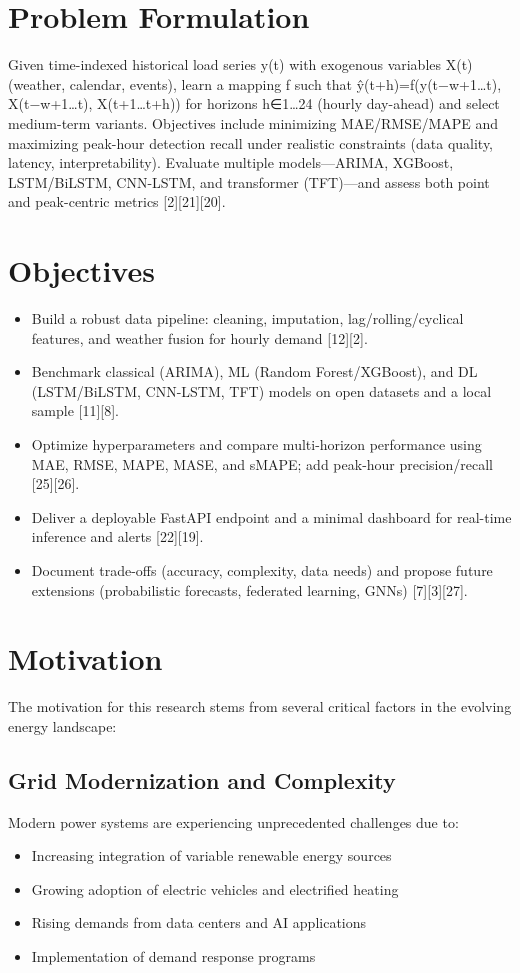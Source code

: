 \documentclass[12pt,a4paper]{report}
\begin{document}
\section{Problem Formulation}
Given time-indexed historical load series y(t) with exogenous variables X(t) (weather, calendar, events), learn a mapping f such that ŷ(t+h)=f(y(t−w+1…t), X(t−w+1…t), X(t+1…t+h)) for horizons h∈{1…24} (hourly day-ahead) and select medium-term variants. Objectives include minimizing MAE/RMSE/MAPE and maximizing peak-hour detection recall under realistic constraints (data quality, latency, interpretability). Evaluate multiple models—ARIMA, XGBoost, LSTM/BiLSTM, CNN-LSTM, and transformer (TFT)—and assess both point and peak-centric metrics [2][21][20].

\section{Objectives}
\begin{itemize}
\item Build a robust data pipeline: cleaning, imputation, lag/rolling/cyclical features, and weather fusion for hourly demand [12][2].

\item Benchmark classical (ARIMA), ML (Random Forest/XGBoost), and DL (LSTM/BiLSTM, CNN-LSTM, TFT) models on open datasets and a local sample [11][8].

\item Optimize hyperparameters and compare multi-horizon performance using MAE, RMSE, MAPE, MASE, and sMAPE; add peak-hour precision/recall [25][26].

\item Deliver a deployable FastAPI endpoint and a minimal dashboard for real-time inference and alerts [22][19].

\item Document trade-offs (accuracy, complexity, data needs) and propose future extensions (probabilistic forecasts, federated learning, GNNs) [7][3][27].
\end{itemize}

\section{Motivation}
The motivation for this research stems from several critical factors in the evolving energy landscape:

\subsection{Grid Modernization and Complexity}
Modern power systems are experiencing unprecedented challenges due to:
\begin{itemize}
\item Increasing integration of variable renewable energy sources
\item Growing adoption of electric vehicles and electrified heating
\item Rising demands from data centers and AI applications
\item Implementation of demand response programs
\end{itemize}
\end{document}
